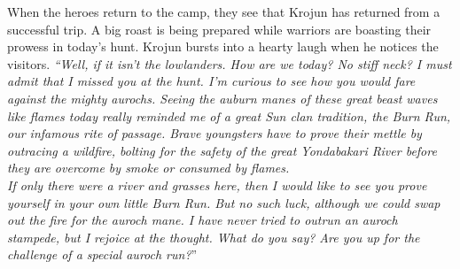 When the heroes return to the camp, they see that Krojun has returned from a successful trip. A big roast is being prepared while warriors are boasting their prowess in today's hunt. Krojun bursts into a hearty laugh when he notices the visitors. {\itshape``Well, if it isn't the lowlanders. How are we today? No stiff neck? I must admit that I missed you at the hunt. I'm curious to see how you would fare against the mighty aurochs. Seeing the auburn manes of these great beast waves like flames today really reminded me of a great Sun clan tradition, the Burn Run, our infamous rite of passage. Brave youngsters have to prove their mettle by outracing a wildfire, bolting for the safety of the great Yondabakari River before they are overcome by smoke or consumed by flames.\\

If only there were a river and grasses here, then I would like to see you prove yourself in your own little Burn Run. But no such luck, although we could swap out the fire for the auroch mane. I have never tried to outrun an auroch stampede, but I rejoice at the thought. What do you say? Are you up for the challenge of a special auroch run?}''\\

